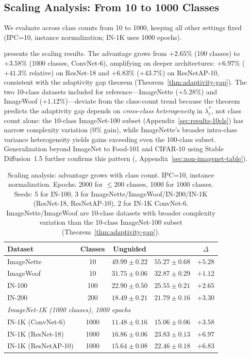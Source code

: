 \subsection{Scaling Analysis: From 10 to 1000 Classes}
\label{sec:scaling-200}

We evaluate \cags{} across class counts from 10 to 1000, keeping all other settings fixed (IPC=10, instance normalization; IN-1K uses 1000 epochs).

 presents the scaling results. The \cags{} advantage grows from $+2.65\%$ (100 classes) to $+3.58\%$ (1000 classes, ConvNet-6), amplifying on deeper architectures: $+6.97\%$ ($+41.3\%$ relative) on ResNet-18 and $+6.83\%$ ($+43.7\%$) on ResNetAP-10, consistent with the adaptivity gap theorem (Theorem~\ref{thm:adaptivity-gap}). The two 10-class datasets included for reference---ImageNette ($+5.28\%$) and ImageWoof ($+1.12\%$)---deviate from the class-count trend because the theorem predicts the adaptivity gap depends on \emph{cross-class heterogeneity} in $\lambda_c^*$, not class count alone: the 10-class ImageNet-100 subset (Appendix~\ref{sec:results-10cls}) has narrow complexity variation ($0\%$ gain), while ImageNette's broader intra-class variance heterogeneity yields gains exceeding even the 100-class subset. Generalization beyond ImageNet to Food-101 and CIFAR-10 using Stable Diffusion~1.5 further confirms this pattern (, Appendix~\ref{sec:non-imagenet-table}).

\begin{table}[t]
\centering
\scriptsize
\caption{Scaling analysis: \cags{} advantage grows with class count. IPC=10, instance normalization. Epochs: 2000 for $\leq$200 classes, 1000 for 1000 classes. Seeds: 5 for IN-100, 3 for ImageNette/ImageWoof/IN-200/IN-1K (ResNet-18, ResNetAP-10), 2 for IN-1K ConvNet-6. ImageNette/ImageWoof are 10-class datasets with broader complexity variation than the 10-class ImageNet-100 subset (Theorem~\ref{thm:adaptivity-gap}).}
\label{tab:scaling}
\begin{tabular}{lcccc}
\toprule
\textbf{Dataset} & \textbf{Classes} & \textbf{Unguided} & \textbf{\cags{}} & \textbf{$\Delta$} \\
\midrule
ImageNette & 10 & $49.99 \pm 0.22$ & $\mathbf{55.27 \pm 0.68}$ & $+5.28$ \\
ImageWoof & 10 & $31.75 \pm 0.06$ & $\mathbf{32.87 \pm 0.29}$ & $+1.12$ \\
IN-100 & 100 & $22.90 \pm 0.50$ & $\mathbf{25.55 \pm 0.21}$ & $+2.65$ \\
IN-200 & 200 & $18.49 \pm 0.21$ & $\mathbf{21.79 \pm 0.16}$ & $+3.30$ \\
\midrule
\multicolumn{5}{l}{\emph{ImageNet-1K (1000 classes), 1000 epochs}} \\
IN-1K (ConvNet-6) & 1000 & $11.48 \pm 0.16$ & $\mathbf{15.06 \pm 0.06}$ & $\mathbf{+3.58}$ \\
IN-1K (ResNet-18) & 1000 & $16.86 \pm 0.06$ & $\mathbf{23.83 \pm 0.13}$ & $\mathbf{+6.97}$ \\
IN-1K (ResNetAP-10) & 1000 & $15.64 \pm 0.08$ & $\mathbf{22.46 \pm 0.18}$ & $\mathbf{+6.83}$ \\
\bottomrule
\end{tabular}
\end{table}
